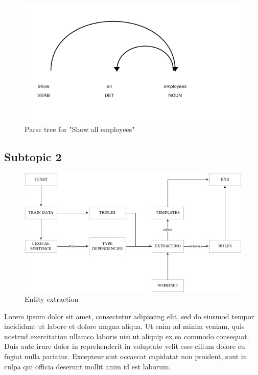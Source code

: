 \documentclass[a4paper,12 pt,oneside]{book}
\begin{document}
\begin{figure}
    \centering
    \includegraphics[width=\textwidth]{images/Show-all-employees.png}
    \caption{Parse tree for "Show all employees"}
    \label{fig:example_2}
\end{figure}

\subsection{Subtopic 2}

\begin{figure}
    \centering
    \includegraphics[width=\textwidth]{images/preprocessing.jpg}
    \caption{Entity extraction}
    \label{fig:preprocessing}
\end{figure}

Lorem ipsum dolor sit amet, consectetur adipiscing elit, sed do eiusmod tempor incididunt ut labore et dolore magna aliqua. Ut enim ad minim veniam, quis nostrud exercitation ullamco laboris nisi ut aliquip ex ea commodo consequat. Duis aute irure dolor in reprehenderit in voluptate velit esse cillum dolore eu fugiat nulla pariatur. Excepteur sint occaecat cupidatat non proident, sunt in culpa qui officia deserunt mollit anim id est laborum.
\end{document}
